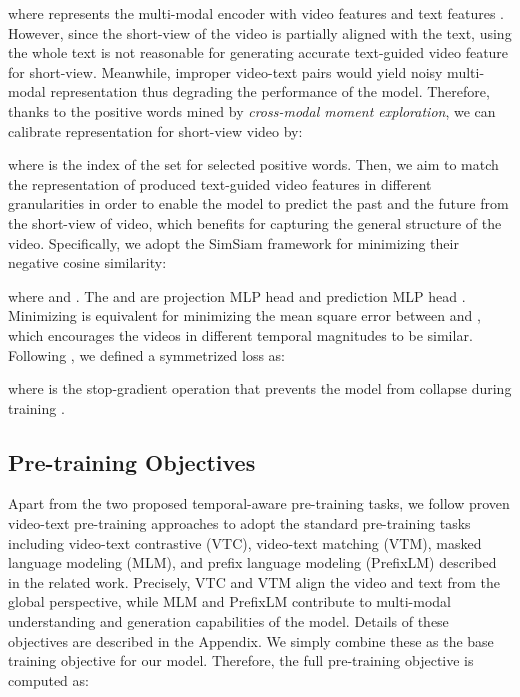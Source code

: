 \documentclass[10pt,twocolumn,letterpaper]{article}
\begin{document}
where  represents the multi-modal encoder with video features  and text features .
However, since the short-view of the video is partially aligned with the text, using the whole text is not reasonable for generating accurate text-guided video feature for short-view. 
Meanwhile, improper video-text pairs would yield noisy multi-modal representation thus degrading the performance of the model. 
Therefore, thanks to the positive words mined by \textit{cross-modal moment exploration}, we can calibrate representation for short-view video by:

where  is the index of the set for selected positive words. Then, we aim to match the representation of produced text-guided video features in different granularities in order to enable the model to predict the past and the future from the short-view of video, which benefits for capturing the general structure of the video. Specifically, we adopt the SimSiam framework \cite{chen2021simsiam} for minimizing their negative cosine similarity:

where  and . The  and  are projection MLP head and prediction MLP head \cite{grill2020byol, chen2021moco}. Minimizing  is equivalent for minimizing the mean square error between  and , which encourages the videos in different temporal magnitudes to be similar. Following \cite{chen2021simsiam, grill2020byol}, we defined a symmetrized loss as:

where  is the stop-gradient operation that prevents the model from collapse during training \cite{chen2021simsiam}. 



\subsection{Pre-training Objectives}
\label{sec:loss}
Apart from the two proposed temporal-aware pre-training tasks, we follow proven video-text pre-training approaches \cite{li2022alpro, bain2021frozen, li2022lavender} to adopt the standard pre-training tasks including video-text contrastive (VTC), video-text matching (VTM), masked language modeling (MLM), and prefix language modeling (PrefixLM) described in the related work. Precisely, VTC and VTM align the video and text from the global perspective, while MLM and PrefixLM contribute to multi-modal understanding and generation capabilities of the model. Details of these objectives are described in the Appendix. We simply combine these as the base training objective  for our model. Therefore, the full pre-training objective is computed as:
\end{document}
